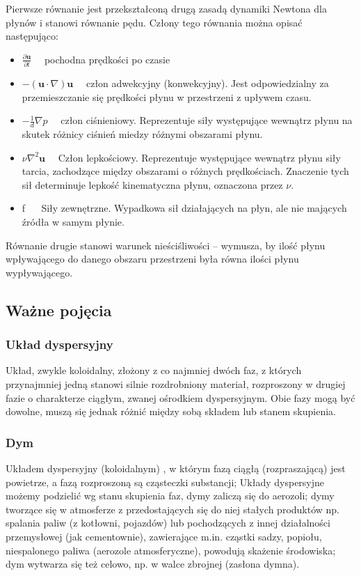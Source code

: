 \documentclass{article}
\begin{document}
\medskip
\noindent Pierwsze równanie jest przekształconą drugą zasadą dynamiki Newtona dla płynów i stanowi równanie pędu. Człony tego równania można opisać następująco:
\begin{itemize}
    \item \( \frac{\partial \mathbf{u}}{\partial t} \quad \) pochodna prędkości po czasie

    \item \( -(\mathbf{u} \cdot \nabla) \mathbf{u} \quad \) człon adwekcyjny (konwekcyjny). Jest odpowiedzialny za przemieszczanie się prędkości płynu w przestrzeni z upływem czasu.

    \item \( -\frac{1}{d} \nabla p \quad \) człon ciśnieniowy. Reprezentuje siły występujące wewnątrz płynu na skutek różnicy ciśnień miedzy różnymi obszarami płynu.
    
    \item \( \nu \nabla^{2} \mathbf{u} \quad \) Człon lepkościowy. Reprezentuje występujące wewnątrz płynu siły tarcia, zachodzące między obszarami o różnych prędkościach. Znaczenie tych sił determinuje lepkość kinematyczna płynu, oznaczona przez \( \nu . \)

    \item f \( \quad \) Siły zewnętrzne. Wypadkowa sił działających na płyn, ale nie mających źródła w samym płynie.
\end{itemize}

\medskip
\noindent Równanie drugie stanowi warunek nieściśliwości – wymusza, by ilość płynu wpływającego do danego obszaru przestrzeni była równa ilości płynu wypływającego.
    
    \subsection{Ważne pojęcia}
        \subsubsection{Układ dyspersyjny} 
        Układ, zwykle koloidalny, złożony z co najmniej dwóch faz, z których przynajmniej jedną stanowi silnie rozdrobniony materiał, rozproszony w drugiej fazie o charakterze ciągłym, zwanej ośrodkiem dyspersyjnym. Obie fazy mogą być dowolne, muszą się jednak różnić między sobą składem lub stanem skupienia.
        
        
        \subsubsection{Dym} 
        Układem dyspersyjny (koloidalnym) , w którym fazą ciągłą (rozpraszającą) jest powietrze, a fazą rozproszoną są cząsteczki substancji; Układy dyspersyjne możemy podzielić wg stanu skupienia faz, dymy zaliczą się do aerozoli; dymy tworzące się w atmosferze z przedostających się do niej stałych produktów np. spalania paliw (z kotłowni, pojazdów) lub pochodzących z innej działalności przemysłowej (jak cementownie), zawierające m.in. cząstki sadzy, popiołu, niespalonego paliwa (aerozole atmosferyczne), powodują skażenie środowiska; dym wytwarza się też celowo, np. w walce zbrojnej (zasłona dymna).
        
\end{document}
